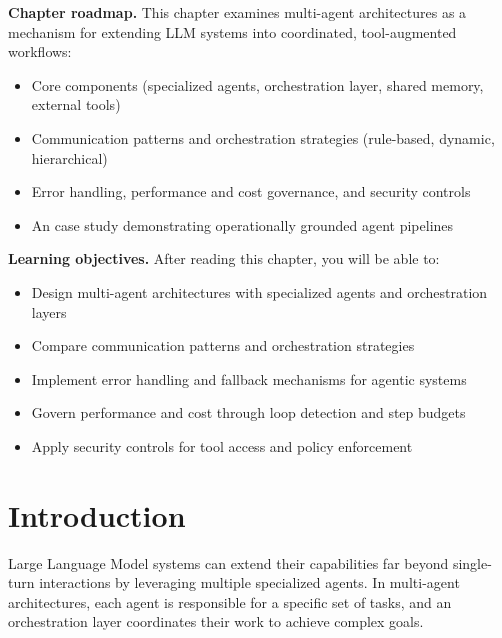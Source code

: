 \begin{tcolorbox}[
  title={\textbf{Chapter Overview}},
  colback=blue!5,
  colframe=blue!40!black,
  colbacktitle=blue!20,
  coltitle=black,
  fonttitle=\bfseries,
  boxrule=0.7pt,
  arc=4pt,
  left=5mm, right=5mm, top=4mm, bottom=4mm
]
\noindent\textbf{Chapter roadmap.}
This chapter examines multi-agent architectures as a mechanism for extending LLM systems into coordinated, tool-augmented workflows:
\begin{itemize}[leftmargin=1.5em, itemsep=3pt]
    \item Core components (specialized agents, orchestration layer, shared memory, external tools)
    \item Communication patterns and orchestration strategies (rule-based, dynamic, hierarchical)
    \item Error handling, performance and cost governance, and security controls
    \item An \ishtar{} case study demonstrating operationally grounded agent pipelines
\end{itemize}

\medskip
\noindent\textbf{Learning objectives.} After reading this chapter, you will be able to:
\begin{itemize}[leftmargin=1.5em, itemsep=3pt]
    \item Design multi-agent architectures with specialized agents and orchestration layers
    \item Compare communication patterns and orchestration strategies
    \item Implement error handling and fallback mechanisms for agentic systems
    \item Govern performance and cost through loop detection and step budgets
    \item Apply security controls for tool access and policy enforcement
\end{itemize}
\end{tcolorbox}




\section{Introduction}
\label{sec:ch9-introduction}
Large Language Model systems can extend their capabilities far beyond single-turn interactions by leveraging multiple specialized agents. In multi-agent architectures, each agent is responsible for a specific set of tasks, and an orchestration layer coordinates their work to achieve complex goals.

